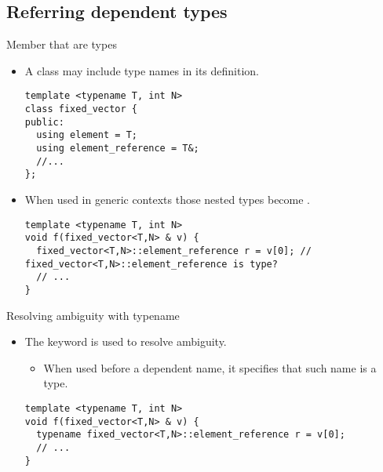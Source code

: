\subsection{Referring dependent types}

\begin{frame}[t,fragile]{Member that are types}
\begin{itemize}
  \item A class may include type names in its definition.
\begin{lstlisting}
template <typename T, int N>
class fixed_vector {
public:
  using element = T;
  using element_reference = T&;
  //...
};
\end{lstlisting}

  \item When used in generic contexts those nested types become .
\begin{lstlisting}
template <typename T, int N>
void f(fixed_vector<T,N> & v) {
  fixed_vector<T,N>::element_reference r = v[0]; // fixed_vector<T,N>::element_reference is type?
  // ...
}
\end{lstlisting}
\end{itemize}
\end{frame}


\begin{frame}[t,fragile]{Resolving ambiguity with typename}
\begin{itemize}
  \item The keyword  is used to resolve ambiguity.
    \begin{itemize}
      \item When used before a dependent name, it specifies that such name is a type.
    \end{itemize}
\begin{lstlisting}
template <typename T, int N>
void f(fixed_vector<T,N> & v) {
  typename fixed_vector<T,N>::element_reference r = v[0]; 
  // ...
}
\end{lstlisting}


\end{itemize}
\end{frame}
